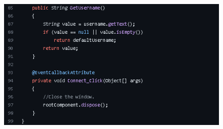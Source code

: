 \documentclass{COMPXXXX}
\begin{document}
\begin{figure}
\centering
\includegraphics[width=1.0\linewidth]{Connect Click.png}
\caption{}
\label{fig:figure01}
\end{figure}
\end{document}
